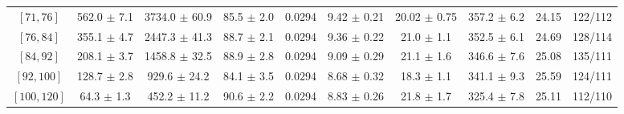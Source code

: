 \begin{tabular}{c||c|c|c|c|c|c|c||c|c}
$[71, 76]$ & 562.0 $\pm$ 7.1 & 3734.0 $\pm$ 60.9 & 85.5 $\pm$ 2.0 & 0.0294 & 9.42 $\pm$ 0.21 & 20.02 $\pm$ 0.75 & 357.2 $\pm$ 6.2 & 24.15 & 122/112\\
$[76, 84]$ & 355.1 $\pm$ 4.7 & 2447.3 $\pm$ 41.3 & 88.7 $\pm$ 2.1 & 0.0294 & 9.36 $\pm$ 0.22 & 21.0 $\pm$ 1.1 & 352.5 $\pm$ 6.1 & 24.69 & 128/114\\
$[84, 92]$ & 208.1 $\pm$ 3.7 & 1458.8 $\pm$ 32.5 & 88.9 $\pm$ 2.8 & 0.0294 & 9.09 $\pm$ 0.29 & 21.1 $\pm$ 1.6 & 346.6 $\pm$ 7.6 & 25.08 & 135/111\\
$[92, 100]$ & 128.7 $\pm$ 2.8 & 929.6 $\pm$ 24.2 & 84.1 $\pm$ 3.5 & 0.0294 & 8.68 $\pm$ 0.32 & 18.3 $\pm$ 1.1 & 341.1 $\pm$ 9.3 & 25.59 & 124/111\\
$[100, 120]$ & 64.3 $\pm$ 1.3 & 452.2 $\pm$ 11.2 & 90.6 $\pm$ 2.2 & 0.0294 & 8.83 $\pm$ 0.26 & 21.8 $\pm$ 1.7 & 325.4 $\pm$ 7.8 & 25.11 & 112/110\\
\end{tabular}
